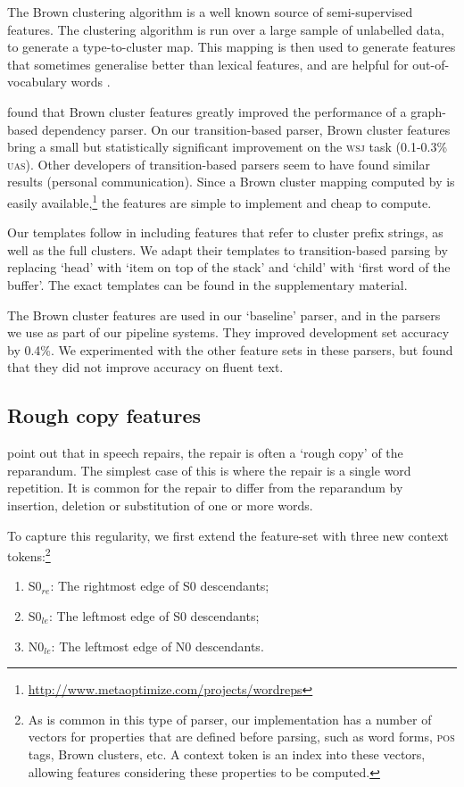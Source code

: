 \documentclass[11pt,letterpaper]{article}
\newcommand{\szero}{S0\xspace}
\newcommand{\nzero}{N0\xspace}
\newcommand{\szeroRedge}{S0$_{re}$\xspace}
\newcommand{\szeroLedge}{S0$_{le}$\xspace}
\newcommand{\nzeroLedge}{N0$_{le}$\xspace}
\begin{document}
The Brown clustering algorithm \citep{brown:92} is a well known source
of semi-supervised features. The clustering algorithm is run over a large sample
of unlabelled data, to generate a type-to-cluster map. This mapping is then used
to generate features that sometimes generalise better than lexical features,
and are helpful for out-of-vocabulary words \citep{turian:10}.

\citet{koo:10} found that Brown cluster features greatly improved the performance
of a graph-based dependency parser. On our transition-based parser, Brown cluster
features bring a small but statistically significant improvement on the \textsc{wsj}
task (0.1-0.3\% \textsc{uas}).  Other developers of transition-based parsers
seem to have found similar results (personal communication).
Since a Brown cluster mapping computed by \citet{liang:05} is easily
available,\footnote{\tiny \url{http://www.metaoptimize.com/projects/wordreps}} the features
are simple to implement and cheap to compute.

Our templates follow \citet{koo:10} in including features that refer to cluster
prefix strings, as well as the full clusters.
We adapt their templates to transition-based parsing
by replacing `head' with `item on top of the stack' and `child' with `first word
of the buffer'. The exact templates can be found in the supplementary material.

The Brown cluster features are used in our `baseline' parser, and in the parsers
we use as part of our pipeline systems. They improved development set accuracy
by 0.4\%.  We experimented with the other feature sets in these parsers, but found
that they did not improve accuracy on fluent text.

\subsection{Rough copy features}

\citet{Johnson04a} point out that in speech repairs, the repair is often a `rough
copy' of the reparandum.  The simplest case of this is where the repair is a single
word repetition.
It is common for the repair to differ from the reparandum by insertion, deletion
or substitution of one or more words.

To capture this regularity, we first extend the feature-set with three new
context tokens:\footnote{As is common
in this type of parser, our implementation has a number of vectors for properties
that are defined before parsing, such as word forms, \textsc{pos} tags, Brown
clusters, etc. A context token is an index into these vectors, allowing
features considering these properties to be computed.}
\begin{enumerate}
    \itemsep0em
    \item \szeroRedge : The rightmost edge of \szero  descendants;
    \item \szeroLedge : The leftmost edge of \szero  descendants;
    \item \nzeroLedge : The leftmost edge of \nzero  descendants.
\end{enumerate}
\end{document}
